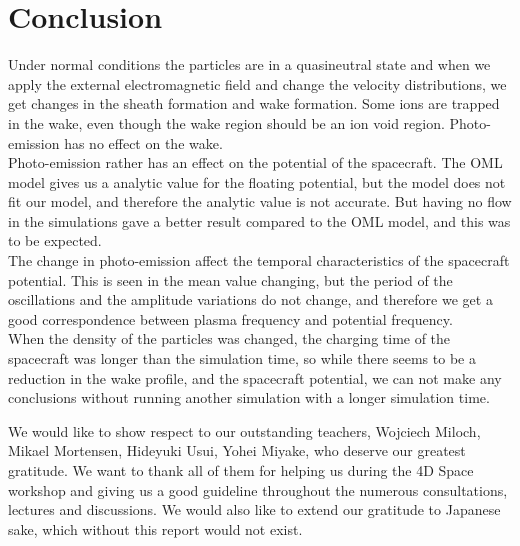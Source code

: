 \documentclass[aip, 
rsi, 
amsmath,
amssymb,
longbibliography,
preprint]{revtex4-1}
\begin{document}
\section{Conclusion}
Under normal conditions the particles are in a quasineutral state and when we apply the external electromagnetic field and change the velocity distributions, we get changes in the sheath formation and wake formation. Some ions are trapped in the wake, even though the wake region should be an ion void region. Photo-emission has no effect on the wake. \\

Photo-emission rather has an effect on the potential of the spacecraft. The OML model gives us a analytic value for the floating potential, but the model does not fit our model, and therefore the analytic value is not accurate. But having no flow in the simulations gave a better result compared to the OML model, and this was to be expected. \\

The change in photo-emission affect the temporal characteristics of the spacecraft potential. This is seen in the mean value changing, but the period of the oscillations and the amplitude variations do not change, and therefore we get a good correspondence between plasma frequency and potential frequency. \\

When the density of the particles was changed, the charging time of the spacecraft was longer than the simulation time, so while there seems to be a reduction in the wake profile, and the spacecraft potential, we can not make any conclusions without running another simulation with a longer simulation time.

\begin{acknowledgments}
We would like to show respect to our outstanding teachers, Wojciech Miloch, Mikael Mortensen, Hideyuki Usui, Yohei Miyake, who deserve our greatest gratitude. We want to thank all of them for helping us during the 4D Space workshop and giving us a good guideline throughout the numerous consultations, lectures and discussions. We would also like to extend our gratitude to Japanese sake, which without this report would not exist.
\end{acknowledgments}


\end{document}
